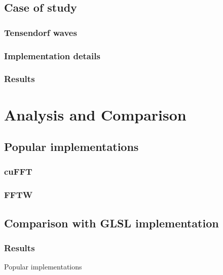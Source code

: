 \documentclass[
  oneside,
  11pt, a4paper,
  footinclude=true,
  headinclude=true,
  cleardoublepage=empty
]{scrbook}
\begin{document}

\section{Case of study}
\subsection{Tensendorf waves}


\subsection{Implementation details}
\subsection{Results}

\chapter{Analysis and Comparison}
\section{Popular implementations}
\subsection{cuFFT}
\subsection{FFTW}
\section{Comparison with GLSL implementation}
\subsection{Results}
Popular implementations
\end{document}
